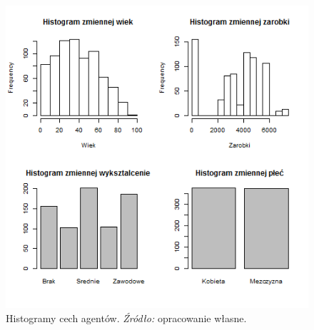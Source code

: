 \documentclass[polish, twoside, 12pt, a4paper]{article}
\theoremstyle{definition}
\theoremstyle{plain}
\theoremstyle{remark}
\begin{document}
\begin{figure}[hbt]
  \centering
    \includegraphics[width=\textwidth]{pictures/ludnosc.png}
  \captionsetup{margin=10pt,font=small,labelfont=bf,width=.8\textwidth}
  \caption[Histogramy cech agentów]{Histogramy cech agentów. \textit{Źródło:} opracowanie własne.}\label{ludnosc}
\end{figure}
\end{document}
